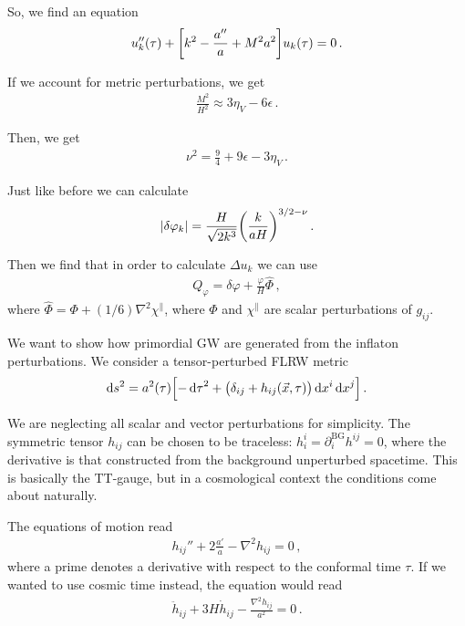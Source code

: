 \documentclass[main.tex]{subfiles}
\begin{document}
So, we find an equation 
%
\begin{align}
u''_k (\tau ) + \qty[ k^2 - \frac{a''}{a} + M^2a^2] u_k (\tau ) = 0
\,.
\end{align}

If we account for metric perturbations, we get 
%
\begin{align}
\frac{M^2}{H^2} \approx 3 \eta _V - 6 \epsilon 
\,.
\end{align}

Then, we get 
%
\begin{align}
\nu^2 = \frac{9}{4} + 9 \epsilon - 3 \eta _V 
\,.
\end{align}

Just like before we can calculate 
%
\begin{align}
\abs{ \delta \varphi _k} = \frac{H}{\sqrt{2 k^3}} \qty( \frac{k}{aH})^{3/2 - \nu }
\,.
\end{align}

Then we find that in order to calculate \(\Delta u_k\) we can use
%
\begin{align}
Q_\varphi = \delta \varphi + \frac{\varphi }{H} \hat{\Phi}
\,,
\end{align}
%
where \(\hat{\Phi} = \Phi + (1/6) \nabla^2 \chi^{\parallel}\), where \(\Phi \) and \(\chi^{\parallel}\) are scalar perturbations of \(g_{ij}\).

We want to show how primordial GW are generated from the inflaton perturbations.
We consider a tensor-perturbed FLRW metric 
%
\begin{align}
\dd{s^2} = a^2 (\tau )
\qty[- \dd{\tau}^2 + \qty(\delta_{ij} + h_{ij} (\vec{x}, \tau )) \dd{x^{i}} \dd{x^{j}}]
\,.
\end{align}

We are neglecting all scalar and vector perturbations for simplicity. 
The symmetric tensor \(h_{ij}\) can be chosen to be traceless: \(h^{i}_{i} = \partial_{i}^{\text{BG}} h^{ij} = 0 \), where the derivative is that constructed from the background unperturbed spacetime. 
This is basically the TT-gauge, but in a cosmological context the conditions come about naturally. 

The equations of motion read 
%
\begin{align}
h_{ij}'' + 2 \frac{a'}{a} - \nabla^2 h_{ij} = 0
\,,
\end{align}
%
where a prime denotes a derivative with respect to the conformal time \(\tau \).
If we wanted to use cosmic time instead, the equation would read 
%
\begin{align}
\ddot{h}_{ij} + 3 H \dot{h}_{ij} - \frac{\nabla^2 h_{ij}}{a^2} = 0
\,.
\end{align}
\end{document}
